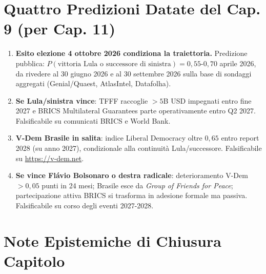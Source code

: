 \section{Quattro Predizioni Datate del Cap. 9 (per Cap.
11)}\label{quattro-predizioni-datate-del-cap.-9-per-cap.-11}

\begin{enumerate}
\def\labelenumi{\arabic{enumi}.}
\tightlist
\item
  \textbf{Esito elezione 4 ottobre 2026 condiziona la traiettoria.}
  Predizione pubblica:
  \(P(\text{vittoria Lula o successore di sinistra}) = 0{,}55\)-\(0{,}70\)
  aprile 2026, da rivedere al 30 giugno 2026 e al 30 settembre 2026
  sulla base di sondaggi aggregati (Genial/Quaest, AtlasIntel,
  Datafolha).
\item
  \textbf{Se Lula/sinistra vince}: TFFF raccoglie \(> 5\)B USD impegnati
  entro fine 2027 e BRICS Multilateral Guarantees parte operativamente
  entro Q2 2027. Falsificabile su comunicati BRICS e World Bank.
\item
  \textbf{V-Dem Brasile in salita}: indice Liberal Democracy oltre
  \(0{,}65\) entro report 2028 (su anno 2027), condizionale alla
  continuità Lula/successore. Falsificabile su \url{https://v-dem.net}.
\item
  \textbf{Se vince Flávio Bolsonaro o destra radicale}: deterioramento
  V-Dem \(> 0{,}05\) punti in 24 mesi; Brasile esce da \emph{Group of
  Friends for Peace}; partecipazione attiva BRICS si trasforma in
  adesione formale ma passiva. Falsificabile su corso degli eventi
  2027-2028.
\end{enumerate}



\section{Note Epistemiche di Chiusura
Capitolo}\label{note-epistemiche-di-chiusura-capitolo}

